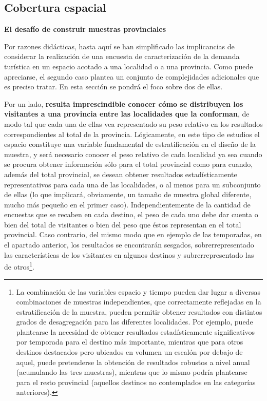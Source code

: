 \documentclass[
]{book}
\begin{document}
\hypertarget{cobertura-espacial}{%
\subsection{Cobertura espacial}\label{cobertura-espacial}}

\textbf{El desafío de construir muestras provinciales}

Por razones didácticas, hasta aquí se han simplificado las implicancias de considerar la realización de una encuesta de caracterización de la demanda turística en un espacio acotado a una localidad o a una provincia. Como puede apreciarse, el segundo caso plantea un conjunto de complejidades adicionales que es preciso tratar. En esta sección se pondrá el foco sobre dos de ellas.

Por un lado, \textbf{resulta imprescindible conocer cómo se distribuyen los visitantes a una provincia entre las localidades que la conforman}, de modo tal que cada una de ellas vea representado su peso relativo en los resultados correspondientes al total de la provincia. Lógicamente, en este tipo de estudios el espacio constituye una variable fundamental de estratificación en el diseño de la muestra, y será necesario conocer el peso relativo de cada localidad ya sea cuando se procura obtener información sólo para el total provincial como para cuando, además del total provincial, se desean obtener resultados estadísticamente representativos para cada una de las localidades, o al menos para un subconjunto de ellas (lo que implicará, obviamente, un tamaño de muestra global diferente, mucho más pequeño en el primer caso). Independientemente de la cantidad de encuestas que se recaben en cada destino, el peso de cada uno debe dar cuenta o bien del total de visitantes o bien del peso que éstos representan en el total provincial. Caso contrario, del mismo modo que en ejemplo de las temporadas, en el apartado anterior, los resultados se encontrarán sesgados, sobrerrepresentado las características de los visitantes en algunos destinos y subrerrepresentado las de otros\footnote{La combinación de las variables espacio y tiempo pueden dar lugar a diversas combinaciones de muestras independientes, que correctamente reflejadas en la estratificación de la muestra, pueden permitir obtener resultados con distintos grados de desagregación para las diferentes localidades. Por ejemplo, puede plantearse la necesidad de obtener resultados estadísticamente significativos por temporada para el destino más importante, mientras que para otros destinos destacados pero ubicados en volumen un escalón por debajo de aquel, puede pretenderse la obtención de resultados robustos a nivel anual (acumulando las tres muestras), mientras que lo mismo podría plantearse para el resto provincial (aquellos destinos no contemplados en las categorías anteriores).}.\\
\end{document}
